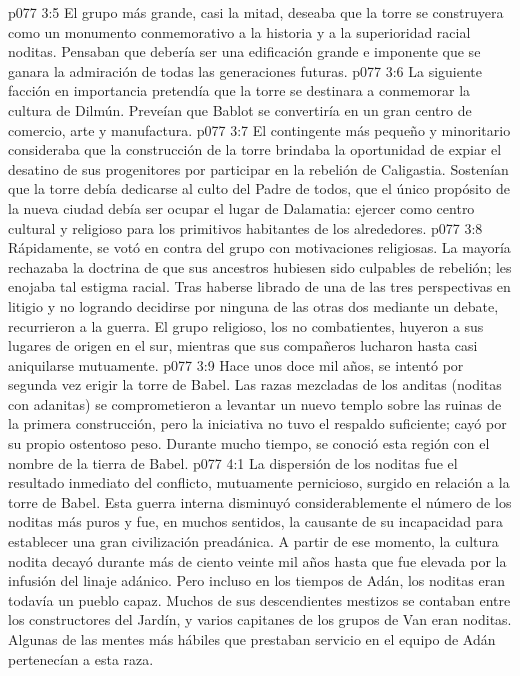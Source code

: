 \vs p077 3:5 El grupo más grande, casi la mitad, deseaba que la torre se construyera como un monumento conmemorativo a la historia y a la superioridad racial noditas. Pensaban que debería ser una edificación grande e imponente que se ganara la admiración de todas las generaciones futuras.
\vs p077 3:6 La siguiente facción en importancia pretendía que la torre se destinara a conmemorar la cultura de Dilmún. Preveían que Bablot se convertiría en un gran centro de comercio, arte y manufactura.
\vs p077 3:7 El contingente más pequeño y minoritario consideraba que la construcción de la torre brindaba la oportunidad de expiar el desatino de sus progenitores por participar en la rebelión de Caligastia. Sostenían que la torre debía dedicarse al culto del Padre de todos, que el único propósito de la nueva ciudad debía ser ocupar el lugar de Dalamatia: ejercer como centro cultural y religioso para los primitivos habitantes de los alrededores.
\vs p077 3:8 \pc Rápidamente, se votó en contra del grupo con motivaciones religiosas. La mayoría rechazaba la doctrina de que sus ancestros hubiesen sido culpables de rebelión; les enojaba tal estigma racial. Tras haberse librado de una de las tres perspectivas en litigio y no logrando decidirse por ninguna de las otras dos mediante un debate, recurrieron a la guerra. El grupo religioso, los no combatientes, huyeron a sus lugares de origen en el sur, mientras que sus compañeros lucharon hasta casi aniquilarse mutuamente.
\vs p077 3:9 \pc Hace unos doce mil años, se intentó por segunda vez erigir la torre de Babel. Las razas mezcladas de los anditas (noditas con adanitas) se comprometieron a levantar un nuevo templo sobre las ruinas de la primera construcción, pero la iniciativa no tuvo el respaldo suficiente; cayó por su propio ostentoso peso. Durante mucho tiempo, se conoció esta región con el nombre de la tierra de Babel.
\vs p077 4:1 La dispersión de los noditas fue el resultado inmediato del conflicto, mutuamente pernicioso, surgido en relación a la torre de Babel. Esta guerra interna disminuyó considerablemente el número de los noditas más puros y fue, en muchos sentidos, la causante de su incapacidad para establecer una gran civilización preadánica. A partir de ese momento, la cultura nodita decayó durante más de ciento veinte mil años hasta que fue elevada por la infusión del linaje adánico. Pero incluso en los tiempos de Adán, los noditas eran todavía un pueblo capaz. Muchos de sus descendientes mestizos se contaban entre los constructores del Jardín, y varios capitanes de los grupos de Van eran noditas. Algunas de las mentes más hábiles que prestaban servicio en el equipo de Adán pertenecían a esta raza.
